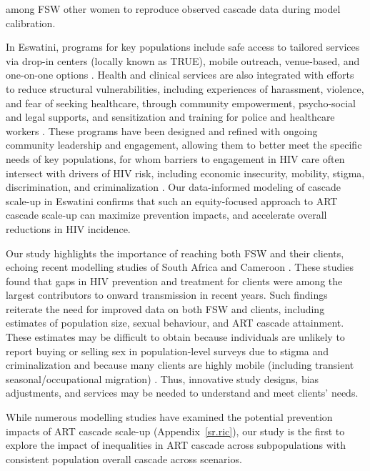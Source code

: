 among FSW \vs other women to reproduce observed cascade data during model calibration.
\par
In Eswatini, programs for key populations include safe access to tailored services via
drop-in centers (locally known as TRUE), mobile outreach, venue-based,
and one-on-one options \cite{EswIBBS2022}.
Health and clinical services are also integrated with
efforts to reduce structural vulnerabilities, including
experiences of harassment, violence, and fear of seeking healthcare,
through community empowerment, psycho-social and legal supports, and
sensitization and training for police and healthcare workers \cite{EswIBBS2022}.
These programs have been designed and refined with ongoing community leadership and engagement,
allowing them to better meet the specific needs of key populations,
for whom barriers to engagement in HIV care often intersect with drivers of HIV risk,
including economic insecurity, mobility, stigma, discrimination, and criminalization
\cite{Lancaster2016sr,Wanyenze2016,Schwartz2017,Schmidt-Sane2022,Camlin2019,Baral2019}.
Our data-informed modeling of cascade scale-up in Eswatini confirms that
such an equity-focused approach to ART cascade scale-up
can maximize prevention impacts, and accelerate overall reductions in HIV incidence.
\par
Our study highlights the importance of reaching both FSW and their clients,
echoing recent modelling studies of South Africa and Cameroon \cite{Stone2021,Silhol2024ptr}.
These studies found that gaps in HIV prevention and treatment for clients
were among the largest contributors to onward transmission in recent years.
Such findings reiterate the need for improved data on both FSW and clients,
including estimates of population size, sexual behaviour, and ART cascade attainment.
These estimates may be difficult to obtain
because individuals are unlikely to report buying or selling sex in population-level surveys
due to stigma and criminalization \cite{Behanzin2013} and
because many clients are highly mobile
(including transient seasonal/occupational migration) \cite{Camlin2019}.
Thus, innovative study designs, bias adjustments, and services may be needed
to understand and meet clients' needs.
\par
While numerous modelling studies have examined
the potential prevention impacts of ART cascade scale-up
\cite{Knight2022sr} (Appendix~\ref{sr.ric}),
our study is the first to explore the impact of
inequalities in ART cascade across subpopulations
with consistent population overall cascade across scenarios.
